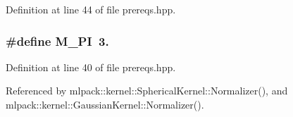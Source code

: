Definition at line 44 of file prereqs.\+hpp.

\subsubsection[{M\+\_\+\+PI}]{\setlength{\rightskip}{0pt plus 5cm}\#define M\+\_\+\+PI~3.}\label{prereqs_8hpp_ae71449b1cc6e6250b91f539153a7a0d3}


Definition at line 40 of file prereqs.\+hpp.



Referenced by mlpack\+::kernel\+::\+Spherical\+Kernel\+::\+Normalizer(), and mlpack\+::kernel\+::\+Gaussian\+Kernel\+::\+Normalizer().

